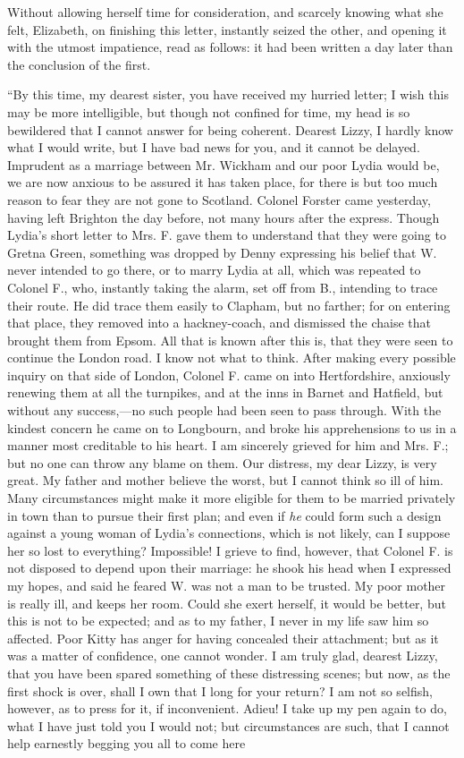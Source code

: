 \documentclass[12pt,openright]{book}
\begin{document}
Without allowing herself time for consideration, and scarcely knowing what she felt, Elizabeth, on finishing this letter, instantly seized the other, and opening it with the utmost impatience, read as follows: it had been written a day later than the conclusion of the first.

“By this time, my dearest sister, you have received my hurried letter; I wish this may be more intelligible, but though not confined for time, my head is so bewildered that I cannot answer for being coherent. Dearest Lizzy, I hardly know what I would write, but I have bad news for you, and it cannot be delayed. Imprudent as a marriage between Mr. Wickham and our poor Lydia would be, we are now anxious to be assured it has taken place, for there is but too much reason to fear they are not gone to Scotland. Colonel Forster came yesterday, having left Brighton the day before, not many hours after the express. Though Lydia’s short letter to Mrs. F. gave them to understand that they were going to Gretna Green, something was dropped by Denny expressing his belief that W. never intended to go there, or to marry Lydia at all, which was repeated to Colonel F., who, instantly taking the alarm, set off from B., intending to trace their route. He did trace them easily to Clapham, but no farther; for on entering that place, they removed into a hackney-coach, and dismissed the chaise that brought them from Epsom. All that is known after this is, that they were seen to continue the London road. I know not what to think. After making every possible inquiry on that side of London, Colonel F. came on into Hertfordshire, anxiously renewing them at all the turnpikes, and at the inns in Barnet and Hatfield, but without any success,—no such people had been seen to pass through. With the kindest concern he came on to Longbourn, and broke his apprehensions to us in a manner most creditable to his heart. I am sincerely grieved for him and Mrs. F.; but no one can throw any blame on them. Our distress, my dear Lizzy, is very great. My father and mother believe the worst, but I cannot think so ill of him. Many circumstances might make it more eligible for them to be married privately in town than to pursue their first plan; and even if \textit{he} could form such a design against a young woman of Lydia’s connections, which is not likely, can I suppose her so lost to everything? Impossible! I grieve to find, however, that Colonel F. is not disposed to depend upon their marriage: he shook his head when I expressed my hopes, and said he feared W. was not a man to be trusted. My poor mother is really ill, and keeps her room. Could she exert herself, it would be better, but this is not to be expected; and as to my father, I never in my life saw him so affected. Poor Kitty has anger for having concealed their attachment; but as it was a matter of confidence, one cannot wonder. I am truly glad, dearest Lizzy, that you have been spared something of these distressing scenes; but now, as the first shock is over, shall I own that I long for your return? I am not so selfish, however, as to press for it, if inconvenient. Adieu! I take up my pen again to do, what I have just told you I would not; but circumstances are such, that I cannot help earnestly begging you all to come here 
\end{document}
